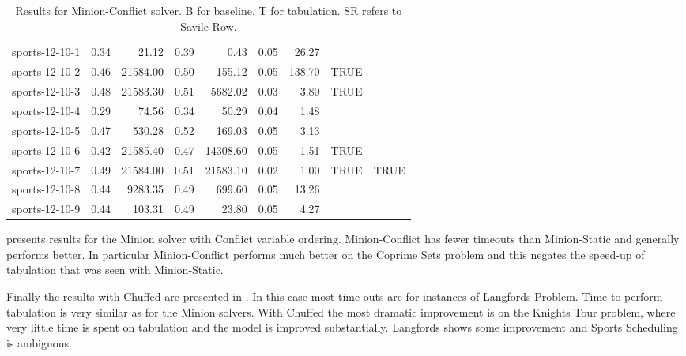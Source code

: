 \documentclass[runningheads]{llncs}
\begin{document}
\begin{table}[ht]
\begin{tabular}{lrrrrrrll}
 sports-12-10-1 & 0.34 & 21.12 & 0.39 & 0.43 & 0.05 & 26.27 &   &   \\ 
 sports-12-10-2 & 0.46 & 21584.00 & 0.50 & 155.12 & 0.05 & 138.70 & TRUE &   \\ 
 sports-12-10-3 & 0.48 & 21583.30 & 0.51 & 5682.02 & 0.03 & 3.80 & TRUE &   \\ 
 sports-12-10-4 & 0.29 & 74.56 & 0.34 & 50.29 & 0.04 & 1.48 &   &   \\ 
 sports-12-10-5 & 0.47 & 530.28 & 0.52 & 169.03 & 0.05 & 3.13 &   &   \\ 
 sports-12-10-6 & 0.42 & 21585.40 & 0.47 & 14308.60 & 0.05 & 1.51 & TRUE &   \\ 
 sports-12-10-7 & 0.49 & 21584.00 & 0.51 & 21583.10 & 0.02 & 1.00 & TRUE & TRUE \\ 
 sports-12-10-8 & 0.44 & 9283.35 & 0.49 & 699.60 & 0.05 & 13.26 &   &   \\ 
 sports-12-10-9 & 0.44 & 103.31 & 0.49 & 23.80 & 0.05 & 4.27 &   &   \\ 
   \hline
\end{tabular}
\caption{Results for Minion-Conflict solver. B for baseline, T for tabulation. SR refers to Savile Row.}\label{tab-conf}
\end{table}


 presents results for the Minion solver with Conflict variable ordering.  Minion-Conflict has fewer timeouts than Minion-Static and generally performs better. In particular Minion-Conflict performs much better on the Coprime Sets problem and this negates the speed-up of tabulation that was seen with Minion-Static.  

Finally the results with Chuffed are presented in . In this case most time-outs are for instances of Langfords Problem. Time to perform tabulation is very similar as for the Minion solvers. With Chuffed the most dramatic improvement is on the Knights Tour problem, where very little time is spent on tabulation and the model is improved substantially. Langfords shows some improvement and Sports Scheduling is ambiguous. 
\end{document}
